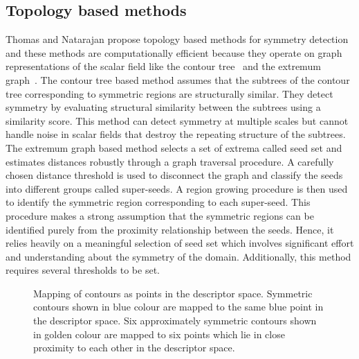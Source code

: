 \documentclass[review,journal]{vgtc}         %
\begin{document}
\subsection{Topology based methods}
Thomas and Natarajan propose topology based methods for symmetry detection and these methods 
are computationally efficient because they operate on graph representations of the scalar field
like the contour tree~\cite{ThomN11} and the extremum graph~\cite{ThomN13}. The contour tree based method 
assumes that the subtrees of the contour tree corresponding to symmetric regions are structurally
similar. They detect symmetry by evaluating structural similarity between the subtrees using a 
similarity score. This method can detect symmetry at multiple scales but cannot handle
noise in scalar fields that destroy the repeating structure of the subtrees. The extremum 
graph based method selects a set of extrema called seed set and 
estimates distances robustly through a graph traversal procedure. A carefully chosen distance 
threshold is used to disconnect the graph and classify the seeds into different groups called 
super-seeds. A region growing procedure is then used to identify the symmetric region 
corresponding to each super-seed. This procedure makes a strong assumption that the symmetric regions
can be identified purely from the proximity relationship between the seeds. Hence,
it relies heavily on a meaningful selection of seed set which involves significant effort 
and understanding about the symmetry of the domain. Additionally, this method requires several thresholds
to be set.
\begin{figure}[b]
\centering
{
	\caption{\label{ctmap}Mapping of contours as points in the descriptor space. Symmetric contours
		shown in blue colour are mapped to the same blue point in the descriptor space. Six approximately
		symmetric contours shown in golden colour are mapped to six points which lie in close
		proximity to each other in the descriptor space.}
}
\end{figure}
\end{document}
